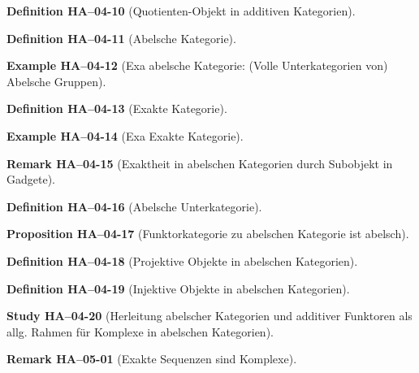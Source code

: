 \documentclass[10pt, letterpaper]{article}
\newcommand{\CustomHeading}[3]{%
  \par\medskip\noindent%
  \textbf{#1 #2} \textnormal{(#3)}.\enskip%
}
\newenvironment{DEF}[2]{\CustomHeading{Definition}{#1}{#2}}{}
\newenvironment{PROP}[2]{\CustomHeading{Proposition}{#1}{#2}}{}
\newenvironment{REM}[2]{\CustomHeading{Remark}{#1}{#2}}{}
\newenvironment{EXA}[2]{\CustomHeading{Example}{#1}{#2}}{}
\newenvironment{STUD}[2]{\CustomHeading{Study}{#1}{#2}}{}
\begin{document}
\begin{DEF}{HA--04-10}{Quotienten-Objekt in additiven Kategorien}
\end{DEF}

\begin{DEF}{HA--04-11}{Abelsche Kategorie}
\end{DEF}

\begin{EXA}{HA--04-12}{Exa abelsche Kategorie: (Volle Unterkategorien von) Abelsche Gruppen}
\end{EXA}

\begin{DEF}{HA--04-13}{Exakte Kategorie}
\end{DEF}

\begin{EXA}{HA--04-14}{Exa Exakte Kategorie}
\end{EXA}

\begin{REM}{HA--04-15}{Exaktheit in abelschen Kategorien durch Subobjekt in Gadgete}
\end{REM}

\begin{DEF}{HA--04-16}{Abelsche Unterkategorie}
\end{DEF}

\begin{PROP}{HA--04-17}{Funktorkategorie zu abelschen Kategorie ist abelsch}
\end{PROP}

\begin{DEF}{HA--04-18}{Projektive Objekte in abelschen Kategorien}
\end{DEF}

\begin{DEF}{HA--04-19}{Injektive Objekte in abelschen Kategorien}
\end{DEF}

\begin{STUD}{HA--04-20}{Herleitung abelscher Kategorien und additiver Funktoren als allg. Rahmen für Komplexe in abelschen Kategorien}
\end{STUD}

\begin{REM}{HA--05-01}{Exakte Sequenzen sind Komplexe}
\end{REM}
\end{document}
